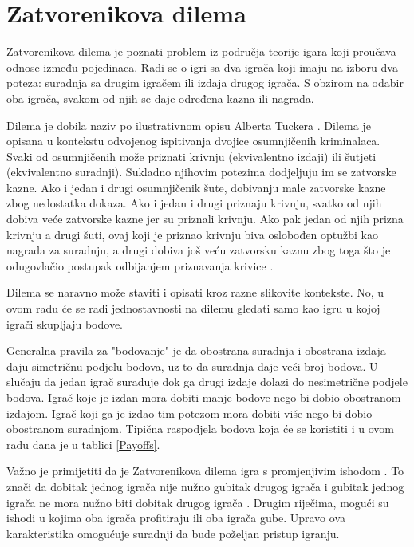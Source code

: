\documentclass[zavrsnirad]{fer}
\begin{document}
\chapter{Zatvorenikova dilema}
\label{pog:ZatvorenikovaDilema}

	Zatvorenikova dilema je poznati problem iz područja teorije igara koji proučava odnose između pojedinaca. Radi se o igri sa dva igrača koji imaju na izboru dva poteza: suradnja sa drugim igračem ili izdaja drugog igrača. S obzirom na odabir oba igrača, svakom od njih se daje određena kazna ili nagrada. 
	
	Dilema je dobila naziv po ilustrativnom opisu Alberta Tuckera \cite{TeorijaIgaraIPravo}. Dilema je opisana u kontekstu odvojenog ispitivanja dvojice osumnjičenih kriminalaca. Svaki od osumnjičenih može priznati krivnju (ekvivalentno izdaji) ili šutjeti (ekvivalentno suradnji). Sukladno njihovim potezima dodjeljuju im se zatvorske kazne. Ako i jedan i drugi osumnjičenik šute, dobivanju male zatvorske kazne zbog nedostatka dokaza. Ako i jedan i drugi priznaju krivnju, svatko od njih dobiva veće zatvorske kazne jer su priznali krivnju. Ako pak jedan od njih prizna krivnju a drugi šuti, ovaj koji je priznao krivnju biva oslobođen optužbi kao nagrada za suradnju, a drugi dobiva još veću zatvorsku kaznu zbog toga što je odugovlačio postupak odbijanjem priznavanja krivice \cite{TeorijaIgaraIPravo}.
	
	Dilema se naravno može staviti i opisati kroz razne slikovite kontekste. No, u ovom radu će se radi jednostavnosti na dilemu gledati samo kao igru u kojoj igrači skupljaju bodove.

	Generalna pravila za "bodovanje" je da obostrana suradnja i obostrana izdaja daju simetričnu podjelu bodova, uz to da suradnja daje veći broj bodova. U slučaju da jedan igrač surađuje dok ga drugi izdaje dolazi do nesimetrične podjele bodova. Igrač koje je izdan mora dobiti manje bodove nego bi dobio obostranom izdajom. Igrač koji ga je izdao tim potezom mora dobiti više nego bi dobio obostranom suradnjom. Tipična raspodjela bodova \cite{1980Axelrod1} koja će se koristiti i u ovom radu dana je u tablici \ref{Payoffs}.
	 
	Važno je primijetiti da je Zatvorenikova dilema igra s promjenjivim ishodom \cite{PrisDilemmaHrEnc}. To znači da dobitak jednog igrača nije nužno gubitak drugog igrača i gubitak jednog igrača ne mora nužno biti dobitak drugog igrača \cite{igraHrEnc}. Drugim riječima, mogući su ishodi u kojima oba igrača profitiraju ili oba igrača gube. Upravo ova karakteristika omogućuje suradnji da bude poželjan pristup igranju. 
	
\end{document}
